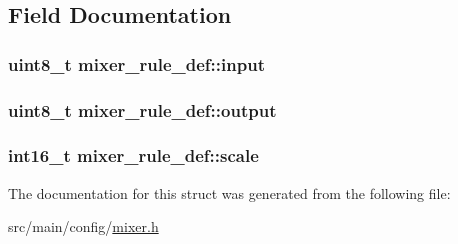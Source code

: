 \subsection{Field Documentation}
\hypertarget{structmixer__rule__def_a113dc2fd59114f28fa4c3c11cf057368}{
\subsubsection[{input}]{\setlength{\rightskip}{0pt plus 5cm}uint8\+\_\+t mixer\+\_\+rule\+\_\+def\+::input}}\label{structmixer__rule__def_a113dc2fd59114f28fa4c3c11cf057368}
\hypertarget{structmixer__rule__def_a583ebc96f008438e206fccab9f6550c1}{
\subsubsection[{output}]{\setlength{\rightskip}{0pt plus 5cm}uint8\+\_\+t mixer\+\_\+rule\+\_\+def\+::output}}\label{structmixer__rule__def_a583ebc96f008438e206fccab9f6550c1}
\hypertarget{structmixer__rule__def_a5fa76f8ead1f034e7f59e7993cdfe82a}{
\subsubsection[{scale}]{\setlength{\rightskip}{0pt plus 5cm}int16\+\_\+t mixer\+\_\+rule\+\_\+def\+::scale}}\label{structmixer__rule__def_a5fa76f8ead1f034e7f59e7993cdfe82a}


The documentation for this struct was generated from the following file\+:\begin{DoxyCompactItemize}
\item 
src/main/config/\hyperlink{config_2mixer_8h}{mixer.\+h}\end{DoxyCompactItemize}

